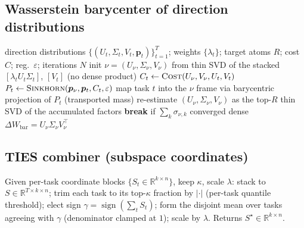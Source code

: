 \documentclass[11pt]{article}
\newcommand{\dW}{\Delta W}
\newcommand{\R}{\mathbb{R}}
\newcommand{\sign}{\operatorname{sign}}
\begin{document}
\subsection{Wasserstein barycenter of direction distributions}
\begin{algorithm}[H]
\caption{Free-support Wasserstein barycenter (M-bary core)}
\begin{algorithmic}[1]
\Require direction distributions $\{(U_t,\Sigma_t,V_t,\bm p_t)\}_{t=1}^T$; weights $\{\lambda_t\}$;
target atoms $R$; cost $C$; reg.\ $\varepsilon$; iterations $N$
\State init $\nu=(U_\nu,\Sigma_\nu,V_\nu)$ from thin SVD of the stacked $[\lambda_t U_t\Sigma_t]$,
$[V_t]$ (no dense product)
    \State $C_t \gets \textsc{Cost}(U_\nu,V_\nu,U_t,V_t)$ 
    \State $P_t \gets \textsc{Sinkhorn}(\bm p_\nu, \bm p_t, C_t, \varepsilon)$
    \State map task $t$ into the $\nu$ frame via barycentric projection of $P_t$ (transported mass)
  \EndFor
  \State re-estimate $(U_\nu,\Sigma_\nu,V_\nu)$ as the top-$R$ thin SVD of the accumulated factors
  \State \textbf{break} if $\sum_k\sigma_{\nu,k}$ converged
\EndFor
\State \Return dense $\dW_{\text{bar}} = U_\nu\Sigma_\nu V_\nu^\top$
\end{algorithmic}
\end{algorithm}

\subsection{TIES combiner (subspace coordinates)}
Given per-task coordinate blocks $\{S_t\in\R^{k\times n}\}$, keep $\kappa$, scale $\lambda$:
stack to $S\in\R^{T\times k\times n}$; trim each task to its top-$\kappa$ fraction by $|\cdot|$
(per-task quantile threshold); elect sign $\gamma=\sign(\sum_t S_t)$; form the disjoint mean over tasks
agreeing with $\gamma$ (denominator clamped at $1$); scale by $\lambda$. Returns $S^\star\in\R^{k\times n}$.
\end{document}
